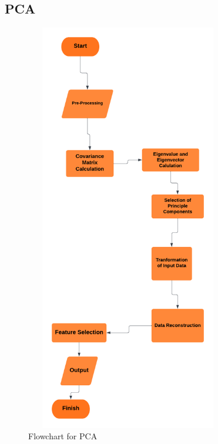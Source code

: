 \subsection{{{\fontsize{14}{19}\selectfont \textbf{PCA}}}}
\vspace{1cm}
\begin{figure}[h]
  \centering
  \includegraphics[width=0.8\textwidth,height=18cm]{sections/LBP/PCA - Page 1.png}
  \caption{Flowchart for PCA}
  \label{fig:figure_label}
\end{figure}
\newpage

